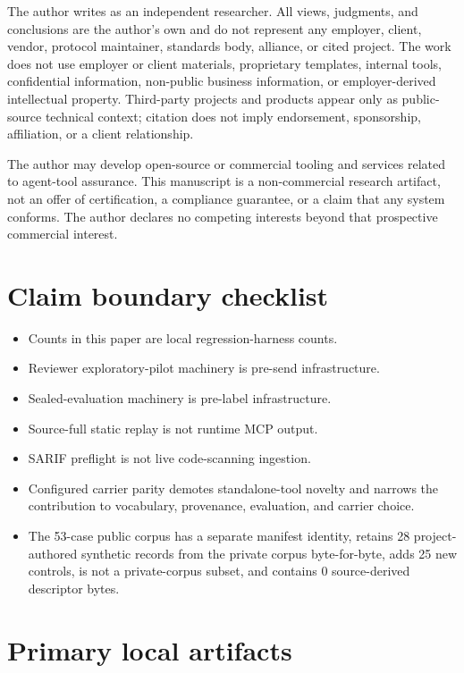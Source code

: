 \documentclass[11pt,letterpaper]{article}
\newcommand{\sarif}{SARIF}
\begin{document}
The author writes as an independent researcher. All views, judgments, and conclusions are the author's own and do not represent any employer, client, vendor, protocol maintainer, standards body, alliance, or cited project. The work does not use employer or client materials, proprietary templates, internal tools, confidential information, non-public business information, or employer-derived intellectual property. Third-party projects and products appear only as public-source technical context; citation does not imply endorsement, sponsorship, affiliation, or a client relationship.

The author may develop open-source or commercial tooling and services related to agent-tool assurance. This manuscript is a non-commercial research artifact, not an offer of certification, a compliance guarantee, or a claim that any system conforms. The author declares no competing interests beyond that prospective commercial interest.

\appendix

\section{Claim boundary checklist}

\begin{itemize}
    \item Counts in this paper are local regression-harness counts.
    \item Reviewer exploratory-pilot machinery is pre-send infrastructure.
    \item Sealed-evaluation machinery is pre-label infrastructure.
    \item Source-full static replay is not runtime MCP output.
    \item \sarif{} preflight is not live code-scanning ingestion.
    \item Configured carrier parity demotes standalone-tool novelty and narrows the contribution to vocabulary, provenance, evaluation, and carrier choice.
    \item The 53-case public corpus has a separate manifest identity, retains 28 project-authored synthetic records from the private corpus byte-for-byte, adds 25 new controls, is not a private-corpus subset, and contains 0 source-derived descriptor bytes.
\end{itemize}

\section{Primary local artifacts}
\end{document}
